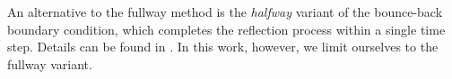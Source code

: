 An alternative to the fullway method is the \textit{halfway} variant of the bounce-back boundary condition, which completes the reflection process within a single time step. Details can be found in \cite{Kruger}. In this work, however, we limit ourselves to the fullway variant.


